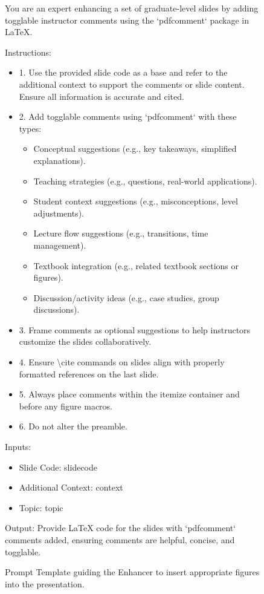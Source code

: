 \documentclass[letterpaper]{article} %
\begin{document}
\begin{figure}
\begin{tcolorbox}[colback=gray!10, colframe=black!90, title=Enhancer: Embedded Comment Prompt Template]

You are an expert enhancing a set of graduate-level slides by adding togglable instructor comments using the `pdfcomment` package in LaTeX.

Instructions:
\begin{itemize}
    \item 1. Use the provided slide code as a base and refer to the additional context to support the comments or slide content. Ensure all information is accurate and cited.
    \item 2. Add togglable comments using `pdfcomment` with these types:
    \begin{itemize}
        \item Conceptual suggestions (e.g., key takeaways, simplified explanations). 
        \item Teaching strategies (e.g., questions, real-world applications).
        \item Student context suggestions (e.g., misconceptions, level adjustments).
        \item Lecture flow suggestions (e.g., transitions, time management).
        \item Textbook integration (e.g., related textbook sections or figures).
        \item Discussion/activity ideas (e.g., case studies, group discussions).
        \end{itemize}


    \item 3. Frame comments as optional suggestions to help instructors customize the slides collaboratively.
    \item 4. Ensure \textbackslash cite commands on slides align with properly formatted references on the last slide.
    \item 5. Always place comments within the itemize container and before any figure macros. 
    \item 6. Do not alter the preamble.
\end{itemize}
Inputs:
\begin{itemize}
    \item Slide Code: {slidecode}
    \item Additional Context: {context}
    \item Topic: {topic}
\end{itemize}

Output:
Provide LaTeX code for the slides with `pdfcomment` comments added, ensuring comments are helpful, concise, and togglable.

\end{tcolorbox}
\caption{Prompt Template guiding the Enhancer to insert appropriate figures into the presentation.}
\label{fig:enhancer_comment_prompt}
\end{figure}
\end{document}
